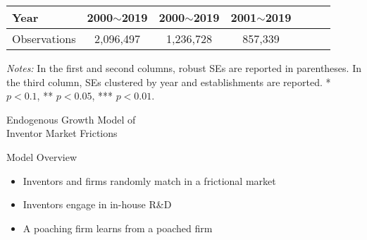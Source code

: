 \documentclass{beamer}
\begin{document}
{\begin{table}[t]
\begin{center}
\begin{tabular}{lcccccc
        }
        Year                  & 2000$\sim$2019                                  & 2000$\sim$2019                & 2001$\sim$2019 \\\hline
        Observations          & 2,096,497                                       & 1,236,728                     & 857,339        \\
        \hline
      \end{tabular}
    \end{center}
    \vspace{0.05in}
    \footnotesize{\tiny\textit{Notes:} In the first and second columns, robust SEs are reported in parentheses. In the third column, SEs clustered by year and establishments are reported. * $p<0.1$, ** $p<0.05$, *** $p<0.01$. }
  \end{table}
}


\begin{frame}{}
  \centering
  {\LARGE Endogenous Growth Model of \\ Inventor Market Frictions}
\end{frame}

\begin{frame}{Model Overview}
  \begin{itemize}
    \setlength\itemsep{3mm}
    \item Inventors and firms randomly match in a frictional market
    \item Inventors engage in in-house R\&D
    \item A poaching firm learns from a poached firm
  \end{itemize}
\end{frame}
\end{document}

